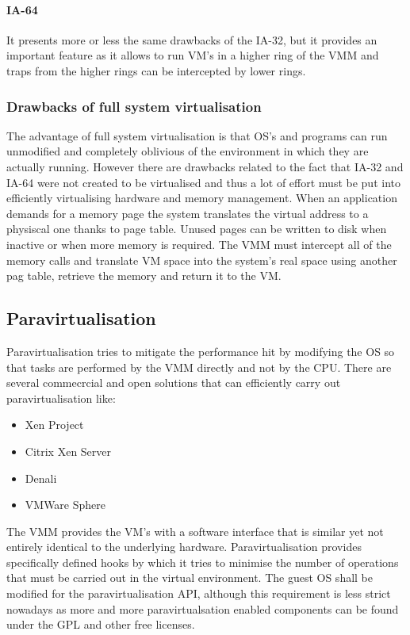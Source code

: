 \documentclass[paper=a4, fontsize=11pt]{report} %
\numberwithin{equation}{section} %
\numberwithin{figure}{section} %
\numberwithin{table}{section} %
\begin{document}
\paragraph{IA-64} It presents more or less the same drawbacks of the IA-32, but 
it provides an important feature as it allows to run VM's in a higher ring of 
the VMM and traps from the higher rings can be intercepted by lower rings.
\subsubsection{Drawbacks of full system virtualisation}
The advantage of full system virtualisation is that OS's and programs can run 
unmodified and completely oblivious of the environment in which they are 
actually running. However there are drawbacks related to the fact that IA-32 
and IA-64 were not created to be virtualised and thus a lot of effort must be 
put into efficiently virtualising hardware and memory management. When an 
application demands for a memory page the system translates the virtual address 
to a physiscal one thanks to page table. Unused pages can be written to disk 
when inactive or when more memory is required. The VMM must intercept all of 
the memory calls and translate VM space into the system's real space using 
another pag table, retrieve the memory and return it to the VM.
\subsection{Paravirtualisation} Paravirtualisation tries to mitigate the 
performance hit by modifying the OS so that tasks are performed by the VMM 
directly and not by the CPU. There are several commecrcial and open solutions 
that can efficiently carry out paravirtualisation like:
\begin{itemize}
	\item Xen Project
	\item Citrix Xen Server
	\item Denali
	\item VMWare Sphere
\end{itemize}
The VMM provides the VM's with a software interface that is similar yet not 
entirely identical to the underlying hardware. Paravirtualisation provides 
specifically defined hooks by which it tries to minimise the number of 
operations that must be carried out in the virtual environment. The guest OS 
shall be modified for the paravirtualisation API, although this requirement is 
less strict nowadays as more and more paravirtualsation enabled components can 
be found under the GPL and other free licenses.
\end{document}
